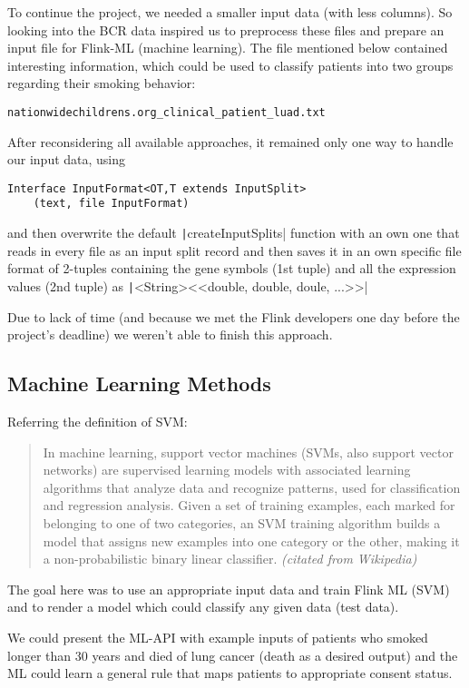 \documentclass{bioinfo}
\begin{document}
\begin{methods}
To continue the project, we needed a smaller input data (with less columns). So looking into the BCR data inspired us to preprocess these files and prepare an input file for Flink-ML (machine learning). The file mentioned below contained interesting information, which could be used to classify patients into two groups regarding their smoking behavior:
\begin{verbatim}
nationwidechildrens.org_clinical_patient_luad.txt
\end{verbatim}

After reconsidering all available approaches, it remained only one way to handle our input data, using
\begin{verbatim}
Interface InputFormat<OT,T extends InputSplit>
	(text, file InputFormat)
\end{verbatim}
and then overwrite the default 
\texttt|createInputSplits|
function with an own one that reads in every file as an input split record and then saves it in an own specific file format of 2-tuples containing the gene symbols (1st tuple) and all the expression values (2nd tuple) as \texttt|<String><<double, double, doule, ...>>| 

Due to lack of time (and because we met the Flink developers one day before the project's deadline) we weren't able to finish this approach.


\subsection{Machine Learning Methods}

Referring the definition of SVM:

\begin{quotation}
In machine learning, support vector machines (SVMs, also support vector networks) are supervised learning models with associated learning algorithms that analyze data and recognize patterns, used for classification and regression analysis. Given a set of training examples, each marked for belonging to one of two categories, an SVM training algorithm builds a model that assigns new examples into one category or the other, making it a non-probabilistic binary linear classifier. \textit{(citated from Wikipedia)}
\end{quotation}

The goal here was to use an appropriate input data and train Flink ML (SVM) and to render a model which could classify any given data (test data).

We could present the ML-API with example inputs of patients who smoked longer than 30 years and died of lung cancer (death as a desired output) and the ML could learn a general rule that maps patients to appropriate consent status.

\end{methods}
\end{document}
